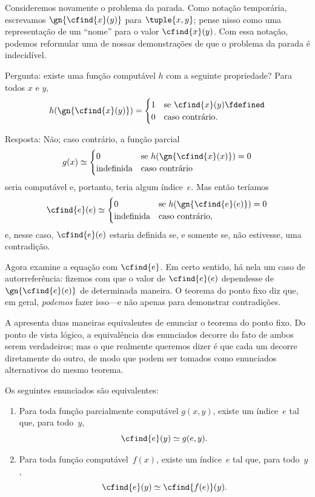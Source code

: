 \documentclass[../../../include/open-logic-section]{subfiles}
\begin{document}

Consideremos novamente o problema da parada. Como notação temporária,
escrevamos $\gn{\cfind{x}(y)}$ para $\tuple{x, y}$; pense nisso como
uma representação de um ``nome'' para o valor $\cfind{x}(y)$. Com
essa notação, podemos reformular uma de nossas demonstrações de que o
problema da parada é indecidível.

Pergunta: existe uma função computável $h$ com a
seguinte propriedade? Para todos $x$ e $y$,
\[
h(\gn{\cfind{x}(y)}) =
\begin{cases}
1 & \text{se $\cfind{x}(y) \fdefined$} \\
0 & \text{caso contrário.}
\end{cases}
\]

Resposta: Não; caso contrário, a função parcial
\[
g(x) \simeq
\begin{cases}
0 & \text{se $h(\gn{\cfind{x}(x)}) = 0$} \\
\text{indefinida} & \text{caso contrário}
\end{cases}
\]
seria computável e, portanto, teria algum índice~$e$. Mas então teríamos
\[
\cfind{e}(e) \simeq
\begin{cases}
0 & \text{se $h(\gn{\cfind{e}(e)}) = 0$} \\
\text{indefinida} & \text{caso contrário,}
\end{cases}
\]
e, nesse caso, $\cfind{e}(e)$ estaria definida se, e somente se, não
estivesse, uma contradição.

Agora examine a equação com $\cfind{e}$. Em certo sentido, há nela um
caso de autorreferência: fizemos com que o valor de $\cfind{e}(e)$
dependesse de $\gn{\cfind{e}(e)}$ de determinada maneira. O teorema do
ponto fixo diz que, em geral, {\em podemos} fazer isso---e não apenas
para demonstrar contradições.

A  apresenta duas maneiras equivalentes de
enunciar o teorema do ponto fixo. Do ponto de vista lógico, a
equivalência dos enunciados decorre do fato de ambos serem verdadeiros;
mas o que realmente queremos dizer é que cada um decorre diretamente
do outro, de modo que podem ser tomados como enunciados alternativos
do mesmo teorema.

\begin{lem}
Os seguintes enunciados são equivalentes:
\begin{enumerate}
\item Para toda função parcialmente computável $g(x,y)$, existe um
  índice~$e$ tal que, para todo~$y$,
\[
\cfind{e}(y) \simeq g(e,y).
\]
\item Para toda função computável~$f(x)$, existe um índice~$e$ tal
  que, para todo~$y$,
\[
\cfind{e}(y) \simeq \cfind{f(e)}(y).
\]
\end{enumerate}
\end{lem}
\end{document}
